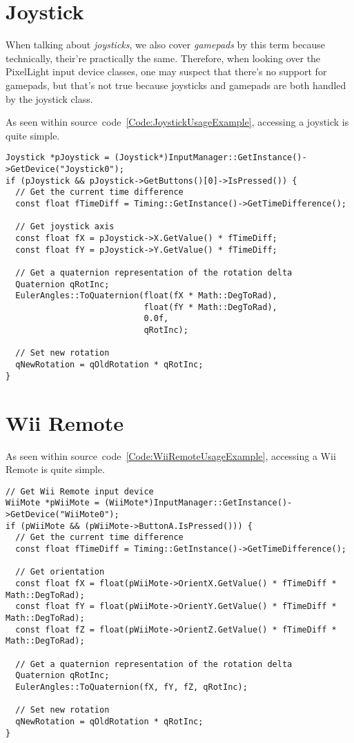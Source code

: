 \section{Joystick}
When talking about \emph{joysticks}, we also cover \emph{gamepads} by this term because technically, their're practically the same. Therefore, when looking over the PixelLight input device classes, one may suspect that there's no support for gamepads, but that's not true because joysticks and gamepads are both handled by the joystick class.

As seen within source~code~\ref{Code:JoystickUsageExample}, accessing a joystick is quite simple.
\begin{lstlisting}[float=htb,label=Code:JoystickUsageExample,caption={Joystick usage example}]
Joystick *pJoystick = (Joystick*)InputManager::GetInstance()->GetDevice("Joystick0");
if (pJoystick && pJoystick->GetButtons()[0]->IsPressed()) {
  // Get the current time difference
  const float fTimeDiff = Timing::GetInstance()->GetTimeDifference();

  // Get joystick axis
  const float fX = pJoystick->X.GetValue() * fTimeDiff;
  const float fY = pJoystick->Y.GetValue() * fTimeDiff;

  // Get a quaternion representation of the rotation delta
  Quaternion qRotInc;
  EulerAngles::ToQuaternion(float(fX * Math::DegToRad),
                            float(fY * Math::DegToRad),
                            0.0f,
                            qRotInc);

  // Set new rotation
  qNewRotation = qOldRotation * qRotInc;
}
\end{lstlisting}




\section{Wii Remote}
As seen within source~code~\ref{Code:WiiRemoteUsageExample}, accessing a Wii Remote is quite simple.
\begin{lstlisting}[float=htb,label=Code:WiiRemoteUsageExample,caption={Wii Remote usage example}]
// Get Wii Remote input device
WiiMote *pWiiMote = (WiiMote*)InputManager::GetInstance()->GetDevice("WiiMote0");
if (pWiiMote && (pWiiMote->ButtonA.IsPressed())) {
  // Get the current time difference
  const float fTimeDiff = Timing::GetInstance()->GetTimeDifference();

  // Get orientation
  const float fX = float(pWiiMote->OrientX.GetValue() * fTimeDiff * Math::DegToRad);
  const float fY = float(pWiiMote->OrientY.GetValue() * fTimeDiff * Math::DegToRad);
  const float fZ = float(pWiiMote->OrientZ.GetValue() * fTimeDiff * Math::DegToRad);

  // Get a quaternion representation of the rotation delta
  Quaternion qRotInc;
  EulerAngles::ToQuaternion(fX, fY, fZ, qRotInc);

  // Set new rotation
  qNewRotation = qOldRotation * qRotInc;
}
\end{lstlisting}




